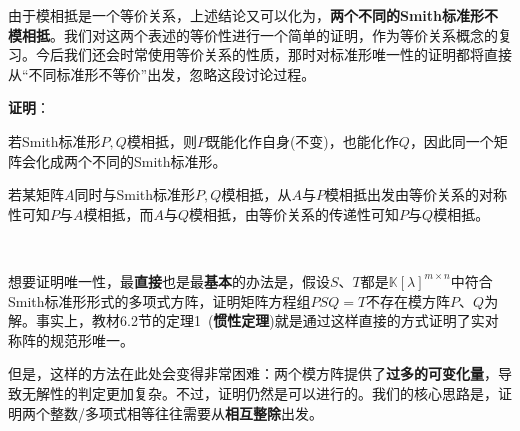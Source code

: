 \documentclass[a4paper,UTF8,fontset=windows,AutoFakeBold]{ctexart}
\newcommand{\proo}[1]{{\vspace{5pt}\kaishu\noindent\textbf{证明}：\vspace{-3pt}
\begin{compactitem}
    \item[] #1
\end{compactitem}
}}
\begin{document}
由于模相抵是一个等价关系，上述结论又可以化为，\textbf{两个不同的Smith标准形不模相抵}。我们对这两个表述的等价性进行一个简单的证明，作为等价关系概念的复习。今后我们还会时常使用等价关系的性质，那时对标准形唯一性的证明都将直接从``不同标准形不等价''出发，忽略这段讨论过程。

\proo{
    若Smith标准形$P,Q$模相抵，则$P$既能化作自身(不变)，也能化作$Q$，因此同一个矩阵会化成两个不同的Smith标准形。

    若某矩阵$A$同时与Smith标准形$P,Q$模相抵，从$A$与$P$模相抵出发由等价关系的对称性可知$P$与$A$模相抵，而$A$与$Q$模相抵，由等价关系的传递性可知$P$与$Q$模相抵。
}

\

想要证明唯一性，最\textbf{直接}也是最\textbf{基本}的办法是，假设$S$、$T$都是$\mathbb{K}[\lambda]^{m\times n}$中符合Smith标准形形式的多项式方阵，证明矩阵方程组$PSQ=T$不存在模方阵$P$、$Q$为解。事实上，教材6.2节的定理1\ (\textbf{惯性定理})就是通过这样直接的方式证明了实对称阵的规范形唯一。

但是，这样的方法在此处会变得非常困难：两个模方阵提供了\textbf{过多的可变化量}，导致无解性的判定更加复杂。不过，证明仍然是可以进行的。我们的核心思路是，证明两个整数/多项式相等往往需要从\textbf{相互整除}出发。
\end{document}
